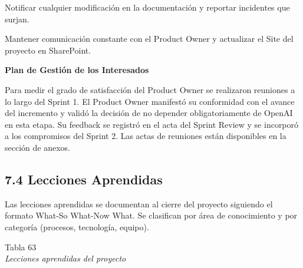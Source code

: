 \documentclass[12pt,a4paper,oneside]{report}
\begin{document}
Notificar cualquier modificación en la documentación y reportar
incidentes que surjan.

Mantener comunicación constante con el Product Owner y actualizar el
Site del proyecto en SharePoint.

\textbf{Plan de Gestión de los Interesados}

Para medir el grado de satisfacción del Product Owner se realizaron
reuniones a lo largo del Sprint 1. El Product Owner manifestó su
conformidad con el avance del incremento y validó la decisión de no
depender obligatoriamente de OpenAI en esta etapa. Su feedback se
registró en el acta del Sprint Review y se incorporó a los compromisos
del Sprint 2. Las actas de reuniones están disponibles en la sección de
anexos.

\subsection{7.4 Lecciones Aprendidas}\label{lecciones-aprendidas}

Las lecciones aprendidas se documentan al cierre del proyecto siguiendo
el formato What-So What-Now What. Se clasifican por área de conocimiento
y por categoría (procesos, tecnología, equipo).

\label{_Toc231672318}{}Tabla 63\\
\emph{Lecciones aprendidas del proyecto}
\end{document}

